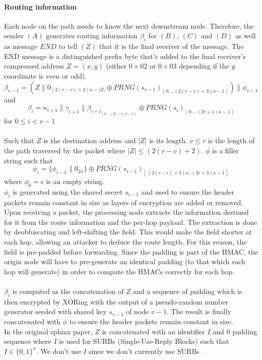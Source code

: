     \paragraph{Routing information}
    Each node on the path needs to know the next downstream node. Therefore, the sender $(A)$ generates routing information $\beta_i$ for $(B)$, $(C)$ and $(D)$ as well as message $END$ to tell $(Z)$ that it is the final receiver of the message. The END message is a distinguished prefix byte that's added to the final receiver's compressed address $Z=(x,y)$ (either $0\times02$ or $0\times03$ depending if the $y$ coordinate is even or odd).
    $$\beta_{v-1}=(Z\|0_{(2(r-v)+2)\kappa-|Z|}\oplus PRNG(s_{v-1})_{[ \,0....(2(r-v)+3)\kappa-1\,]})\|\phi_{v-1}$$
    and
    $$\beta_i=n_{i+1}\|\gamma_{i+1}\|\beta_{{i+1}_{[ \,0....(2r-1)\kappa-1\,] }}\oplus PRNG(s_{i})_{[ \,0....(2r+1)\kappa-1\,]} $$ for $0\le i < v-1$ 
    \\~\\Such that $Z$ is the destination address and $|Z|$ is its length.
    $v\leq r$ is the length of the path traversed by the packet where $|Z| \leq (2(r - v) + 2)$. $\phi$ is a filler string such that
    $$\phi_i=\{ \phi_{i-1}\|0_{2\kappa}\}\oplus PRNG(s_{i-1})_{[ \,(2(r-i)+3)\kappa..(2r+3)\kappa-1\,]}$$ where $\phi_0=\epsilon$ is an empty string.
    \\$\phi_i$ is generated using the shared secret $s_{i-1}$ and used to ensure the header packets remain constant in size as layers of encryption are added or removed. Upon receiving a packet, the processing node extracts the information destined for it from the route information and the per-hop payload. The extraction is done by deobfuscating and left-shifting the field. This would make the field shorter at each hop, allowing an attacker to deduce the route length. For this reason, the field is pre-padded before forwarding. Since the padding is part of the HMAC, the origin node will have to pre-generate an identical padding (to that which each hop will generate) in order to compute the HMACs correctly for each hop.
    \\~\\$\beta_i$ is computed as the concatenation of $Z$ and a sequence of padding which is then encrypted by XORing with the output of a pseudo-random number generator seeded with shared key $s_{v-1}$ of node $v-1$. The result is finally concatenated with $\phi$ to ensure the header packets remain constant in size.
    \\In the original sphinx paper, $Z$ is concatenated with an identifier $I$ and $0$ padding sequence where $I$ is used for SURBs (Single-Use-Reply Blocks) such that $I \in \{0, 1\}^\kappa$. We don't use $I$ since we don't currently use SURBs .

